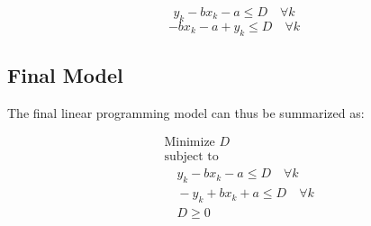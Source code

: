 \documentclass{article}
\begin{document}
\[
y_k - bx_k - a \leq D \quad \forall k
\]
\[
-bx_k - a + y_k \leq D \quad \forall k
\]

\subsection*{Final Model}

The final linear programming model can thus be summarized as:

\[
\begin{aligned}
& \text{Minimize } D \\
& \text{subject to} \\
& \quad y_k - bx_k - a \leq D \quad \forall k \\
& \quad -y_k + bx_k + a \leq D \quad \forall k \\
& \quad D \geq 0
\end{aligned}
\]
\end{document}
